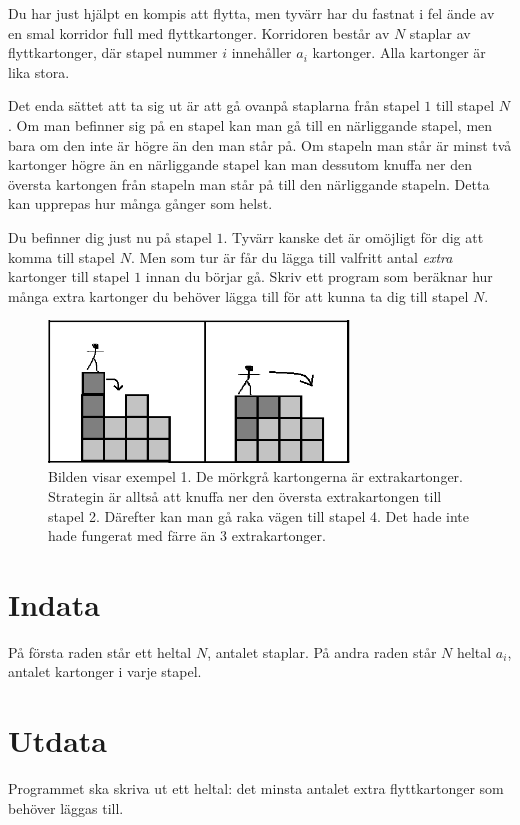 

Du har just hjälpt en kompis att flytta, men tyvärr har du fastnat i
fel ände av en smal korridor full med flyttkartonger. Korridoren
består av $N$ staplar av flyttkartonger, där stapel nummer $i$
innehåller $a_i$ kartonger. Alla kartonger är lika stora.

Det enda sättet att ta sig ut är att gå ovanpå staplarna från stapel
$1$ till stapel $N$. Om man befinner sig på en stapel kan man gå till
en närliggande stapel, men bara om den inte är högre än den man står
på. Om stapeln man står är minst två kartonger högre än en närliggande
stapel kan man dessutom knuffa ner den översta kartongen från stapeln
man står på till den närliggande stapeln. Detta kan upprepas hur många
gånger som helst. 

Du befinner dig just nu på stapel $1$. Tyvärr kanske det är omöjligt
för dig att komma till stapel $N$. Men som tur är får du lägga till
valfritt antal {\em extra} kartonger till stapel $1$ innan du börjar gå. Skriv ett program som
beräknar hur många extra kartonger du behöver lägga till för att kunna
ta dig till stapel $N$.

\begin{figure}[!h]
\begin{center}
\includegraphics[width=8cm]{kartongbild2.png}
\end{center}
\caption{Bilden visar exempel 1. De mörkgrå kartongerna är extrakartonger. Strategin är alltså att knuffa ner den översta extrakartongen till stapel 2. Därefter kan man gå raka vägen till stapel 4. Det hade inte hade fungerat med färre än 3 extrakartonger.}
\end{figure}

\section*{Indata}
På första raden står ett heltal $N$, antalet staplar. På andra raden står $N$ heltal $a_i$, antalet kartonger i varje stapel. 

\section*{Utdata}
Programmet ska skriva ut ett heltal: det minsta antalet extra flyttkartonger som behöver läggas till.


